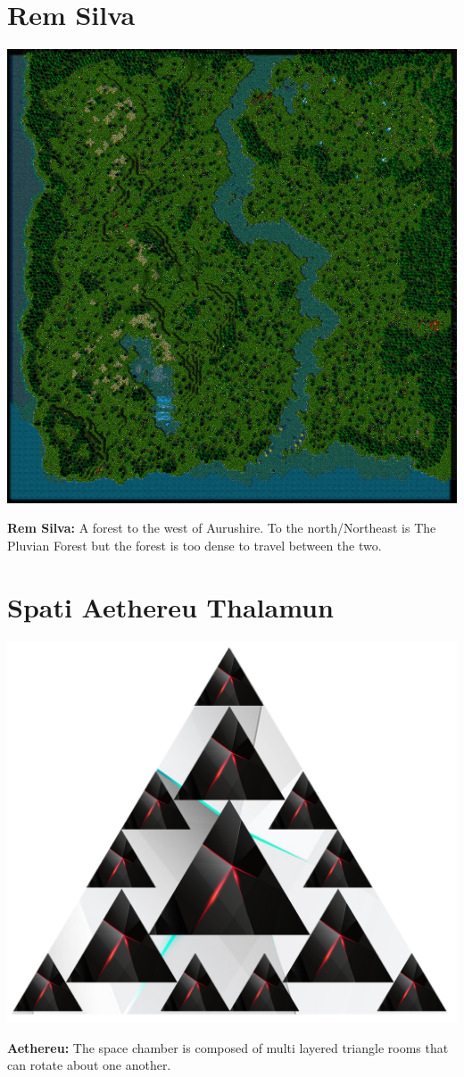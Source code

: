 \documentclass[letterpaper,10pt,twoside,twocolumn,openany]{book}
\begin{document}
\section{Rem Silva}
\begin{center}
	\includegraphics[width=\linewidth]{img/RemSilva.png}
	
	{\textbf{Rem Silva:} A forest to the west of Aurushire. To the north/Northeast is The Pluvian Forest but the forest is too dense to travel between the two.}
\end{center}

\section{Spati Aethereu Thalamun}
\begin{center}
	\includegraphics[width=\linewidth]{img/Aethereu.png}	
	
	{\textbf{Aethereu:} The space chamber is composed of multi layered triangle rooms that can rotate about one another.}
\end{center}

\end{document}
